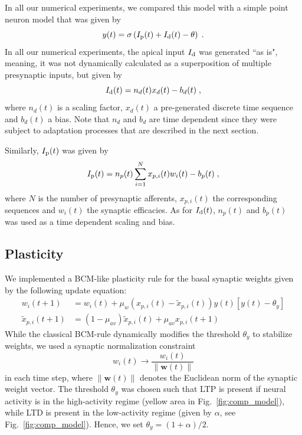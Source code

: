 \documentclass[10pt,a4paper,twocolumn]{article}
\begin{document}
		In all our numerical experiments, we compared this model with a 
		simple point neuron model that was given by
		\begin{equation}
			y(t) = \sigma\left(I_{\rm p}(t) + I_{\rm d}(t) - \theta \right) \; .
		\end{equation}
		In all our numerical experiments, the apical input $I_{\rm d}$ was generated
		``as is", meaning, it was not dynamically calculated as a superposition
		of multiple presynaptic inputs, but given by
		\begin{equation}
			I_{\rm d}(t) = n_d(t) x_d(t) - b_d(t) \; ,
			\label{eq:I_d}
		\end{equation}
		where $n_d(t)$ is a scaling factor, $x_d(t)$ a pre-generated
		discrete time sequence and $b_d(t)$ a bias. Note that $n_d$ and $b_d$ 
		are time dependent since they were subject to adaptation processes 
		that are described in the next section.
		
		Similarly, $I_{\rm p}(t)$ was given by
		\begin{equation}
			I_{\rm p}(t) = n_p(t) \sum_{i=1}^{N} x_{p,i}(t) w_i(t) - b_p(t) \; ,
		\end{equation}
		where $N$ is the number of presynaptic afferents, $x_{p,i}(t)$ the
		corresponding sequences and $w_i(t)$ the synaptic efficacies.
		As for $I_{\rm d}(t)$, $n_p(t)$ and $b_p(t)$ was used as a time dependent
		scaling and bias.
		
		\subsection{Plasticity}
		
		We implemented a BCM-like plasticity rule for the basal 
		synaptic weights given by the following update equation:
		\begin{align}
			w_i(t+1) &= w_i(t) + \mu_w \left(x_{p,i}(t) - \tilde{x}_{p,i}(t)\right)
			y(t)\left[y(t) - \theta_y \right]
			\label{eq:bcm_plast} \\
			\tilde{x}_{p,i}(t+1) &= (1-\mu_{av})\tilde{x}_{p,i}(t) + \mu_{av}x_{p,i}(t+1)
		\end{align}
		While the classical BCM-rule dynamically modifies the 
		threshold $\theta_y$ to stabilize weights, we used a
		synaptic normalization constraint
		\begin{equation}
			w_i(t) \rightarrow \frac{w_i(t)}{\lVert \mathbf{w}(t)\rVert}
		\end{equation}
		in each time step, where $\lVert \mathbf{w}(t)\rVert$ denotes the Euclidean
		norm of the synaptic weight vector. The threshold $\theta_y$ was
		chosen such that LTP is present if neural activity is in the
		high-activity regime (yellow area in Fig.~\ref{fig:comp_model}), while
		LTD is present in the low-activity regime 
		(given by $\alpha$, see Fig.~\ref{fig:comp_model}). Hence, we set
		$\theta_y = (1+\alpha)/2$.
		
\end{document}
